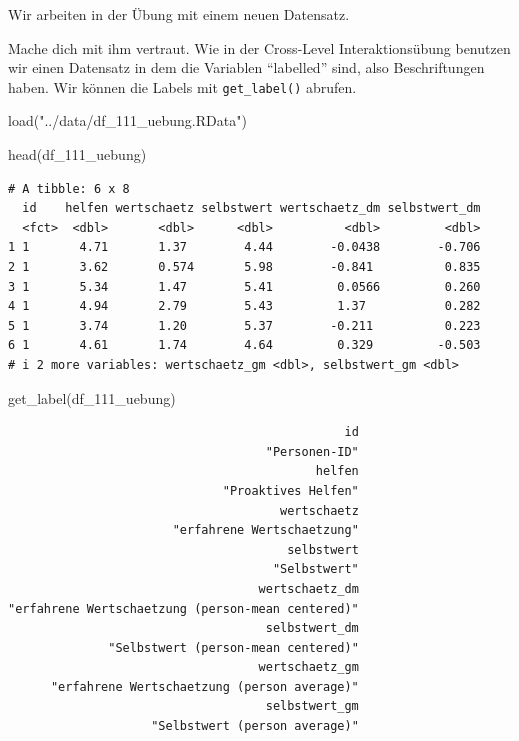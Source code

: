 \documentclass[
  letterpaper,
  DIV=11,
  numbers=noendperiod]{scrreprt}
\newenvironment{Shaded}{\begin{snugshade}}{\end{snugshade}}
\newcommand{\FunctionTok}[1]{\textcolor[rgb]{0.28,0.35,0.67}{#1}}
\newcommand{\NormalTok}[1]{\textcolor[rgb]{0.00,0.23,0.31}{#1}}
\newcommand{\StringTok}[1]{\textcolor[rgb]{0.13,0.47,0.30}{#1}}
\begin{document}
Wir arbeiten in der Übung mit einem neuen Datensatz.

Mache dich mit ihm vertraut. Wie in der Cross-Level Interaktionsübung
benutzen wir einen Datensatz in dem die Variablen ``labelled'' sind,
also Beschriftungen haben. Wir können die Labels mit
\texttt{get\_label()} abrufen.

\begin{Shaded}
\begin{Highlighting}[]
\FunctionTok{load}\NormalTok{(}\StringTok{"../data/df\_111\_uebung.RData"}\NormalTok{)}

\FunctionTok{head}\NormalTok{(df\_111\_uebung)}
\end{Highlighting}
\end{Shaded}

\begin{verbatim}
# A tibble: 6 x 8
  id    helfen wertschaetz selbstwert wertschaetz_dm selbstwert_dm
  <fct>  <dbl>       <dbl>      <dbl>          <dbl>         <dbl>
1 1       4.71       1.37        4.44        -0.0438        -0.706
2 1       3.62       0.574       5.98        -0.841          0.835
3 1       5.34       1.47        5.41         0.0566         0.260
4 1       4.94       2.79        5.43         1.37           0.282
5 1       3.74       1.20        5.37        -0.211          0.223
6 1       4.61       1.74        4.64         0.329         -0.503
# i 2 more variables: wertschaetz_gm <dbl>, selbstwert_gm <dbl>
\end{verbatim}

\begin{Shaded}
\begin{Highlighting}[]
\FunctionTok{get\_label}\NormalTok{(df\_111\_uebung)}
\end{Highlighting}
\end{Shaded}

\begin{verbatim}
                                               id 
                                    "Personen-ID" 
                                           helfen 
                              "Proaktives Helfen" 
                                      wertschaetz 
                       "erfahrene Wertschaetzung" 
                                       selbstwert 
                                     "Selbstwert" 
                                   wertschaetz_dm 
"erfahrene Wertschaetzung (person-mean centered)" 
                                    selbstwert_dm 
              "Selbstwert (person-mean centered)" 
                                   wertschaetz_gm 
      "erfahrene Wertschaetzung (person average)" 
                                    selbstwert_gm 
                    "Selbstwert (person average)" 
\end{verbatim}
\end{document}
